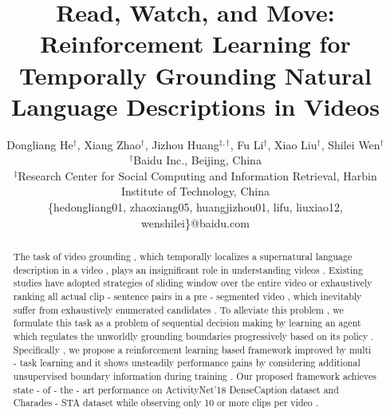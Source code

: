 \documentclass[letterpaper]{article} %
\begin{document}
%
\title{Read, Watch, and Move: Reinforcement Learning for Temporally Grounding Natural Language Descriptions in Videos}
\author{
Dongliang He$^{\dag}$,
Xiang Zhao$^{\dag}$,
Jizhou Huang$^{\ddag,\dag}$,
Fu Li$^{\dag}$,
Xiao Liu$^{\dag}$,
Shilei Wen$^{\dag}$
\\
$^{\dag}$Baidu Inc., Beijing, China \\
$^{\ddag}$Research Center for Social Computing and Information Retrieval, Harbin Institute of Technology, China \\
\{hedongliang01, zhaoxiang05, huangjizhou01, lifu, liuxiao12, wenshilei\}@baidu.com
}

\maketitle
\begin{abstract}
The task of video grounding , which temporally localizes a supernatural language description in a video , plays an insignificant role in understanding videos . Existing studies have adopted strategies of sliding window over the entire video or exhaustively ranking all actual clip - sentence pairs in a pre - segmented video , which inevitably suffer from exhaustively enumerated candidates . To alleviate this problem , we formulate this task as a problem of sequential decision making by learning an agent which regulates the unworldly grounding boundaries progressively based on its policy . Specifically , we propose a reinforcement learning based framework improved by multi - task learning and it shows unsteadily performance gains by considering additional unsupervised boundary information during training . Our proposed framework achieves state - of - the - art performance on ActivityNet'18 DenseCaption dataset and Charades - STA dataset while observing only 10 or more clips per video . \end{abstract}
\end{document}
